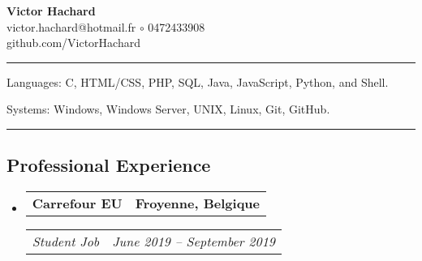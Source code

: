 \documentclass[10pt,letterpaper]{article}
\makeatletter
\newenvironment{indentsection}[1]
{\begin{list}{}
  {\setlength{\leftmargin}{#1}} \item[]
}
{\end{list}}
\newcommand{\headerrow}[2]
{\begin{tabular*}{\linewidth}{l@{\extracolsep{\fill}}r}
  #1 &
  #2 \\
\end{tabular*}}
\makeatother
\begin{document}
\begin{center}
  \huge \textbf{Victor Hachard} \\
  \large
  victor.hachard@hotmail.fr
  $\circ$
  0472433908
  \\
  github.com/VictorHachard
  \vspace{-0.2em}
\end{center}


\hrule
\begin{indentsection}{\parindent}
\begin{description*}
  \item[Languages:] C, HTML/CSS, PHP, SQL, Java, JavaScript, Python, and Shell.
  \item[Systems:] Windows, Windows Server, UNIX, Linux, Git, GitHub.
\end{description*}
\end{indentsection}


\hrule
\vspace{-0.4em}
\subsection*{Professional Experience}
\begin{itemize}
  \parskip=0.1em

  \item
  \headerrow
    {\textbf{Carrefour EU}}
    {\textbf{Froyenne, Belgique}}
  \headerrow
    {\emph{Student Job}}
    {\emph{June 2019 -- September 2019}}

  \end{itemize}


%
%
%
\end{document}
